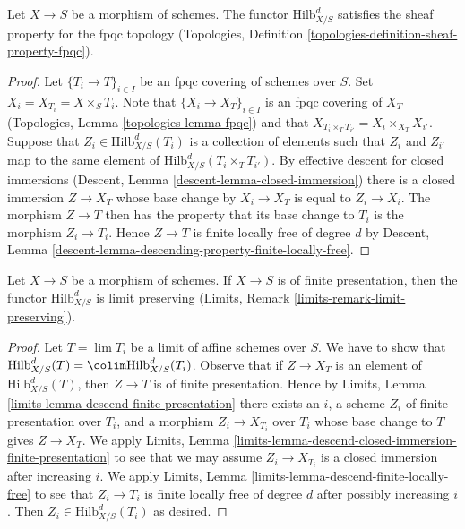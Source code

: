 \begin{lemma}
\label{lemma-hilb-d-sheaf}
Let $X \to S$ be a morphism of schemes. The functor $\text{Hilb}^d_{X/S}$
satisfies the sheaf property for the fpqc topology
(Topologies, Definition \ref{topologies-definition-sheaf-property-fpqc}).
\end{lemma}

\begin{proof}
Let $\{T_i \to T\}_{i \in I}$ be an fpqc covering of schemes over $S$.
Set $X_i = X_{T_i} = X \times_S T_i$.
Note that $\{X_i \to X_T\}_{i \in I}$ is an fpqc covering of
$X_T$ (Topologies, Lemma \ref{topologies-lemma-fpqc})
and that $X_{T_i \times_T T_{i'}} = X_i \times_{X_T} X_{i'}$.
Suppose that $Z_i \in \text{Hilb}^d_{X/S}(T_i)$ is a collection of
elements such that $Z_i$ and $Z_{i'}$ map to the same element of
$\text{Hilb}^d_{X/S}(T_i \times_T T_{i'})$. By effective descent
for closed immersions (Descent, Lemma \ref{descent-lemma-closed-immersion})
there is a closed immersion $Z \to X_T$ whose base change by
$X_i \to X_T$ is equal to $Z_i \to X_i$. The morphism $Z \to T$
then has the property that its base change to $T_i$ is the morphism
$Z_i \to T_i$. Hence $Z \to T$ is finite locally free of degree $d$
by Descent, Lemma \ref{descent-lemma-descending-property-finite-locally-free}.
\end{proof}

\begin{lemma}
\label{lemma-hilb-d-limit-preserving}
Let $X \to S$ be a morphism of schemes. If $X \to S$ is
of finite presentation, then the functor $\text{Hilb}^d_{X/S}$
is limit preserving (Limits, Remark \ref{limits-remark-limit-preserving}).
\end{lemma}

\begin{proof}
Let $T = \lim T_i$ be a limit of affine schemes over $S$. We have to show
that $\text{Hilb}^d_{X/S}(T) = \colim \text{Hilb}^d_{X/S}(T_i)$.
Observe that if $Z \to X_T$ is an element of $\text{Hilb}^d_{X/S}(T)$,
then $Z \to T$ is of finite presentation. Hence by
Limits, Lemma \ref{limits-lemma-descend-finite-presentation}
there exists an $i$, a scheme $Z_i$ of finite presentation over $T_i$,
and a morphism $Z_i \to X_{T_i}$ over $T_i$ whose base change to $T$
gives $Z \to X_T$. We apply Limits, Lemma
\ref{limits-lemma-descend-closed-immersion-finite-presentation}
to see that we may assume $Z_i \to X_{T_i}$ is a closed immersion
after increasing $i$.
We apply Limits, Lemma \ref{limits-lemma-descend-finite-locally-free}
to see that $Z_i \to T_i$ is finite locally free of degree $d$
after possibly increasing $i$.
Then $Z_i \in \text{Hilb}^d_{X/S}(T_i)$ as desired.
\end{proof}

